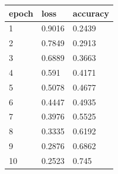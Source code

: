 \begin{tabular}{lll}
\hline
epoch & loss & accuracy \\
\hline
1 & 0.9016 & 0.2439 \\
2 & 0.7849 & 0.2913 \\
3 & 0.6889 & 0.3663 \\
4 & 0.591 & 0.4171 \\
5 & 0.5078 & 0.4677 \\
6 & 0.4447 & 0.4935 \\
7 & 0.3976 & 0.5525 \\
8 & 0.3335 & 0.6192 \\
9 & 0.2876 & 0.6862 \\
10 & 0.2523 & 0.745 \\
\hline
\end{tabular}
